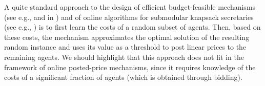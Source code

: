 A quite standard approach to the design of efficient budget-feasible mechanisms (see e.g., \cite[Section~5]{Bada2012} and in 
\cite[Section~4]{AmanatidisKS22}) and of online algorithms for submodular knapsack secretaries (see e.g., \cite{FeldmanNS11}) is to first learn the costs of a random subset of agents. Then, based on these costs, the mechanism approximates the optimal solution of the resulting random instance and uses its value as a threshold to post linear prices to the remaining agents. We should highlight that this approach does not fit in the framework of online posted-price mechanisms, since it requires knowledge of the costs of a significant fraction of agents (which is obtained through bidding).
